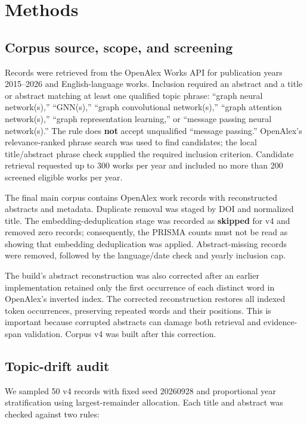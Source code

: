 \documentclass[sigconf,review,anonymous]{acmart}
\begin{document}
\section{Methods}
\subsection{Corpus source, scope, and screening}
Records were retrieved from the OpenAlex Works API for publication years 2015–2026 and English-language works. Inclusion required an abstract and a title or abstract matching at least one qualified topic phrase: “graph neural network(s),” “GNN(s),” “graph convolutional network(s),” “graph attention network(s),” “graph representation learning,” or “message passing neural network(s).” The rule does \textbf{not} accept unqualified “message passing.” OpenAlex’s relevance-ranked phrase search was used to find candidates; the local title/abstract phrase check supplied the required inclusion criterion. Candidate retrieval requested up to 300 works per year and included no more than 200 screened eligible works per year.

The final main corpus contains OpenAlex work records with reconstructed abstracts and metadata. Duplicate removal was staged by DOI and normalized title. The embedding-deduplication stage was recorded as \textbf{skipped} for v4 and removed zero records; consequently, the PRISMA counts must not be read as showing that embedding deduplication was applied. Abstract-missing records were removed, followed by the language/date check and yearly inclusion cap.

The build’s abstract reconstruction was also corrected after an earlier implementation retained only the first occurrence of each distinct word in OpenAlex’s inverted index. The corrected reconstruction restores all indexed token occurrences, preserving repeated words and their positions. This is important because corrupted abstracts can damage both retrieval and evidence-span validation. Corpus v4 was built after this correction.

\subsection{Topic-drift audit}
We sampled 50 v4 records with fixed seed 20260928 and proportional year stratification using largest-remainder allocation. Each title and abstract was checked against two rules:
\end{document}
